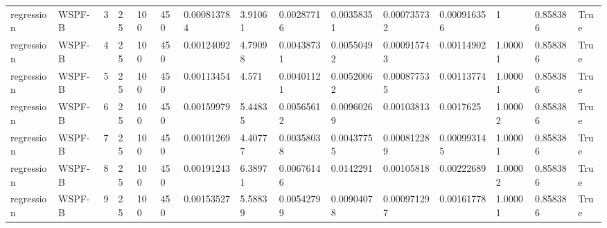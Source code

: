 \begin{tabular}{lllllllllllllll}
regression & WSPF-B & 3 & 25 & 100 & 450 & 0.000813784 & 3.91061 & 0.00287716 & 0.00358351 & 0.000735732 & 0.000916356 & 1 & 0.858386 & True \\
regression & WSPF-B & 4 & 25 & 100 & 450 & 0.00124092 & 4.79098 & 0.00438731 & 0.00550492 & 0.000915743 & 0.00114902 & 1.00001 & 0.858386 & True \\
regression & WSPF-B & 5 & 25 & 100 & 450 & 0.00113454 & 4.571 & 0.00401121 & 0.00520062 & 0.000877535 & 0.00113774 & 1.00001 & 0.858386 & True \\
regression & WSPF-B & 6 & 25 & 100 & 450 & 0.00159979 & 5.44835 & 0.00565612 & 0.00960269 & 0.00103813 & 0.0017625 & 1.00002 & 0.858386 & True \\
regression & WSPF-B & 7 & 25 & 100 & 450 & 0.00101269 & 4.40777 & 0.00358038 & 0.00437755 & 0.000812289 & 0.000993145 & 1.00001 & 0.858386 & True \\
regression & WSPF-B & 8 & 25 & 100 & 450 & 0.00191243 & 6.38971 & 0.00676146 & 0.0142291 & 0.00105818 & 0.00222689 & 1.00002 & 0.858386 & True \\
regression & WSPF-B & 9 & 25 & 100 & 450 & 0.00153527 & 5.58839 & 0.00542799 & 0.00904078 & 0.000971297 & 0.00161778 & 1.00001 & 0.858386 & True \\
\hline
\end{tabular}
